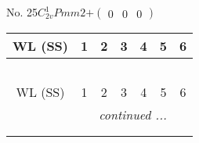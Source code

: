 \documentclass[fleqn,9pt,landscape]{jsarticle}
\begin{document}
\newpage
No. 25\quad$C_{2v}^{1}$\quad$Pmm2$\quad[ orthorhombic ]\quad$+\begin{pmatrix} 0 & 0 & 0 \end{pmatrix}$
\begin{center}
\renewcommand{\arraystretch}{1.2}
\begin{longtable}{ccccccc}
 \hline \hline
WL (SS) & 1 & 2 & 3 & 4 & 5 & 6 \\ \hline \endfirsthead

\multicolumn{6}{l}{\tablename\ \thetable{}} \\
 \hline \hline
WL (SS) & 1 & 2 & 3 & 4 & 5 & 6 \\ \hline \endhead

 \hline \hline
\multicolumn{6}{r}{\footnotesize\it continued ...} \\ \endfoot

 \hline \hline
\multicolumn{6}{r}{} \\ \endlastfoot


\end{longtable}
\end{center}
\end{document}
